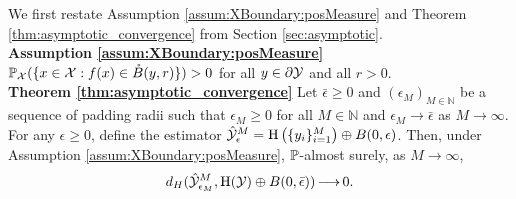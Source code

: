 \documentclass[12pt]{l4dc2022} %
\begin{document}
We first restate Assumption \ref{assum:XBoundary:posMeasure} and Theorem \ref{thm:asymptotic_convergence} from Section \ref{sec:asymptotic}. 
\\[2mm]
% 
\textbf{Assumption \ref{assum:XBoundary:posMeasure}} $\mathbb{P}_{\mathcal{X}}(\{x\in\mathcal{X}: f(x)\in\mathring{B}(y,r)\})>0$  
for all $y\in\partial\mathcal{Y}$ and all $r>0$.
% 
% 
\\[2mm]
\textbf{Theorem \ref{thm:asymptotic_convergence}}
% 
Let $\bar{\epsilon}\geq 0$ and 
$(\epsilon_M)_{M\in\mathbb{N}}$ be a sequence of padding radii such that $\epsilon_M\geq 0$ for all $M\in\mathbb{N}$ and $\epsilon_M\rightarrow \bar{\epsilon}$ as $M\rightarrow\infty$. 
For any $\epsilon\geq 0$, define the estimator $\hat{\mathcal{Y}}^M_{\epsilon}=\textrm{H}\left(\{y_i\}_{i{=}1}^M\right)\oplus B(0,\epsilon)$.  
Then, under Assumption \ref{assum:XBoundary:posMeasure}, $\mathbb{P}$-almost surely, 
as $M\rightarrow\infty$, 
$$
d_H(
\hat{\mathcal{Y}}_{\epsilon_M}^M, 
\textrm{H}(\mathcal{Y})\oplus B(0,\bar{\epsilon})
)
\mathop{\longrightarrow} 0.
$$
% 
% 
% 
% 
\end{document}
